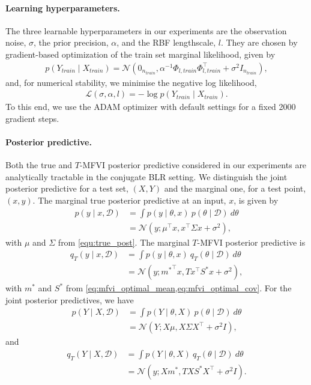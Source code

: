 \documentclass{article}
\theoremstyle{plain}
\theoremstyle{definition}
\theoremstyle{remark}
\theoremstyle{plain}
\begin{document}
\paragraph{Learning hyperparameters.} The three learnable hyperparameters in our experiments are the observation noise, $\sigma$, the prior precision, $\alpha$, and the RBF lengthscale, $l$. They are chosen by gradient-based optimization of the train set marginal likelihood, given by
\begin{align}
    p(Y_{train}\mid X_{train}) = \mathcal{N}(0_{n_{train}}, \alpha^{-1}\Phi_{l, train} \Phi_{l, train}^\top + \sigma^2I_{n_{train}}),
\end{align}
and, for numerical stability, we minimise the negative log likelihood,
\begin{align}
    \mathcal{L}(\sigma, \alpha, l) = - \log p(Y_{train}\mid X_{train}).
\end{align}
To this end, we use the ADAM optimizer \citep{kingma2015adam} with default settings for a fixed 2000 gradient steps. 

\paragraph{Posterior predictive.} Both the true and $T$-MFVI posterior predictive considered in our experiments are analytically tractable in the conjugate BLR setting. We distinguish the joint posterior predictive for a test set, $(X, Y)$ and the marginal one, for a test point, $(x,y)$.  The marginal true posterior predictive at an input, $x$, is given by
\begin{align}
    p(y \mid x, \mathcal{D}) &= \int p(y \mid \theta, x)\  p(\theta \mid \mathcal{D}) \ d\theta \\
    & = \mathcal{N}(y ; \mu^\top x, x^\top \Sigma x + \sigma^2 ),
\end{align}
with $\mu$ and $\Sigma$ from \cref{equ:true_post}. The marginal $T$-MFVI posterior predictive is 
\begin{align}
    q_T(y \mid x, \mathcal{D}) &= \int p(y \mid \theta, x)\  q_T(\theta \mid \mathcal{D}) \ d\theta \\
    & = \mathcal{N}(y ; {m^*}^\top x, Tx^\top S^* x + \sigma^2 ),
\end{align}
with $m^*$ and $S^*$ from \cref{eq:mfvi_optimal_mean,eq:mfvi_optimal_cov}.
For the joint posterior predictives, we have 
\begin{align}
    p(Y \mid X, \mathcal{D}) &= \int p(Y \mid \theta, X)\  p(\theta \mid \mathcal{D}) \ d\theta \\
    & = \mathcal{N}(Y ; X\mu, X\Sigma X^\top + \sigma^2 I ),
\end{align}
and
\begin{align}
    q_T(Y \mid X, \mathcal{D}) &= \int p(Y \mid \theta, X)\  q_T(\theta \mid \mathcal{D}) \ d\theta \\
    & = \mathcal{N}(y ; Xm^*, TXS^*X^\top + \sigma^2 I).
\end{align}
\end{document}
